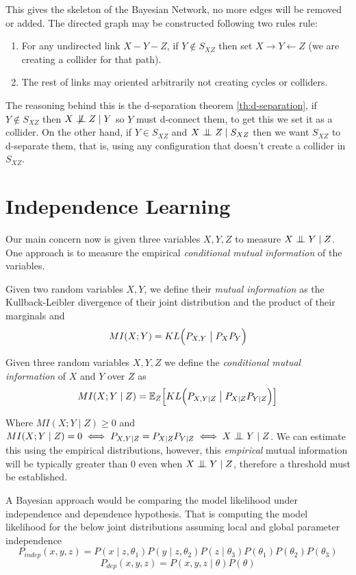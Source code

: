 This gives the skeleton of the Bayesian Network, no more edges will be removed or added. The directed graph may be constructed following two rules rule:
\begin{enumerate}
  \item For any undirected link \(X - Y - Z\), if \(Y \notin S_{XZ}\) then set
    \(X \to Y \leftarrow Z\) (we are creating a collider for that path).
  \item The rest of links may oriented arbitrarily not
creating cycles or colliders.
\end{enumerate}
The reasoning behind this is the
d-separation theorem \ref{th:d-separation},  if \(Y \notin S_{XZ}\) then \(X \bigCD Z \mid Y\) so \(Y\) must d-connect them, to get this we set it as a collider. On the other hand, if \(Y \in S_{XZ}\) and
\(X \bigCI Z \mid S_{XZ}\) then we want \(S_{XZ}\) to d-separate them, that is,
using any configuration that doesn't create a collider in \(S_{XZ}\).

\section{Independence Learning}

Our main concern now is given three variables \(X, Y, Z\) to measure \(X \bigCI Y \mid Z\). One approach is to measure the empirical \emph{conditional mutual information} of the variables.

\begin{definition}
  Given two random variables \(X, Y\), we define their \emph{mutual information} as the Kullback-Leibler divergence of their joint distribution and the product of their marginals and
  \[
    MI(X;Y) = KL\Big(P_{X,Y} \bigm| P_{X}P_{Y}\Big)
  \]
\end{definition}

\begin{definition}
  Given three random variables \(X, Y, Z\) we define the \emph{conditional mutual information} of \(X\) and \(Y\) over \(Z\) as
  \[
    MI(X;Y\mid Z) = \mathbb{E}_{Z}\Big[KL\Big(P_{X,Y \mid Z} \bigm| P_{X\mid Z} P_{Y \mid Z}\Big)\Big]
  \]
\end{definition}
Where \(MI(X;Y \mid Z) \geq 0\) and \(MI(X;Y \mid Z) = 0 \iff P_{X,Y \mid Z} = P_{X\mid Z} P_{Y \mid Z} \iff X\bigCI Y \mid Z\). We can estimate this using the empirical distributions, however, this \emph{empirical} mutual information will be typically greater than \(0\) even when \(X\bigCI Y \mid Z\), therefore a threshold must be established.

A Bayesian approach would be comparing the model likelihood under independence and dependence hypothesis. That is computing the model likelihood for the below joint distributions assuming local and global parameter independence
\[
  P_{indep}(x,y,z) = P(x\mid z, \theta_{1})P(y \mid z, \theta_{2})P(z \mid \theta_{3})P(\theta_{1})P(\theta_{2})P(\theta_{3})
\]
\[
P_{dep}(x,y,z) = P(x,y,z \mid \theta)P(\theta)
\]
